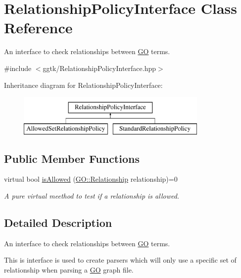 \hypertarget{classRelationshipPolicyInterface}{}\section{Relationship\+Policy\+Interface Class Reference}
\label{classRelationshipPolicyInterface}


An interface to check relationships between \hyperlink{namespaceGO}{GO} terms.  




{\ttfamily \#include $<$ggtk/\+Relationship\+Policy\+Interface.\+hpp$>$}

Inheritance diagram for Relationship\+Policy\+Interface\+:\begin{figure}[H]
\begin{center}
\leavevmode
\includegraphics[height=2.000000cm]{classRelationshipPolicyInterface}
\end{center}
\end{figure}
\subsection*{Public Member Functions}
\begin{DoxyCompactItemize}
\item 
virtual bool \hyperlink{classRelationshipPolicyInterface_ad28012b607e9cf848c791b6a907bb2cb}{is\+Allowed} (\hyperlink{namespaceGO_aaa3905b2e000a8be411da8038827f993}{G\+O\+::\+Relationship} relationship)=0
\begin{DoxyCompactList}\small\item\em A pure virtual meethod to test if a relationship is allowed. \end{DoxyCompactList}\end{DoxyCompactItemize}


\subsection{Detailed Description}
An interface to check relationships between \hyperlink{namespaceGO}{GO} terms. 

This is interface is used to create parsers which will only use a specific set of relationship when parsing a \hyperlink{namespaceGO}{GO} graph file. 

